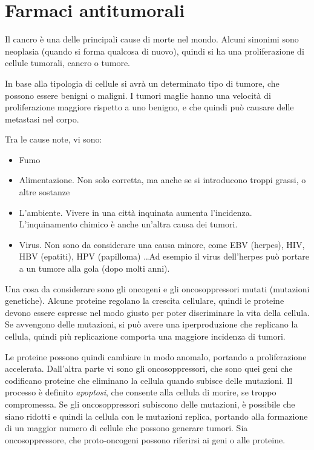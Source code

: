 \chapter{Farmaci antitumorali}

Il cancro è una delle principali cause di morte nel mondo. Alcuni
sinonimi sono neoplasia (quando si forma qualcosa di nuovo), quindi si
ha una proliferazione di cellule tumorali, cancro o tumore.

In base alla tipologia di cellule si avrà un determinato tipo di tumore,
che possono essere benigni o maligni. I tumori maglie hanno una velocità
di proliferazione maggiore rispetto a uno benigno, e che quindi può
causare delle metastasi nel corpo.

Tra le cause note, vi sono:
\begin{itemize}
\item
  Fumo
\item
  Alimentazione. Non solo corretta, ma anche se si introducono troppi
  grassi, o altre sostanze
\item
  L'ambiente. Vivere in una città inquinata aumenta l'incidenza.
  L'inquinamento chimico è anche un'altra causa dei tumori.
\item
  Virus. Non sono da considerare una causa minore, come EBV (herpes),
  HIV, HBV (epatiti), HPV (papilloma) \ldots Ad esempio il virus
  dell'herpes può portare a un tumore alla gola (dopo molti anni).
\end{itemize}

Una cosa da considerare sono gli oncogeni e gli oncosoppressori mutati
(mutazioni genetiche). Alcune proteine regolano la crescita cellulare,
quindi le proteine devono essere espresse nel modo giusto per poter
discriminare la vita della cellula. Se avvengono delle mutazioni, si
può avere una iperproduzione che replicano la cellula, quindi più
replicazione comporta una maggiore incidenza di tumori.

Le proteine
possono quindi cambiare in modo anomalo, portando a proliferazione
accelerata. Dall'altra parte vi sono gli oncosoppressori, che sono
quei geni che codificano proteine che eliminano la cellula quando
subisce delle mutazioni. Il processo è definito \emph{apoptosi}, che
consente alla cellula di morire, se troppo compromessa. Se gli
oncosoppressori subiscono delle mutazioni, è possibile che siano
ridotti e quindi la cellula con le mutazioni replica, portando alla
formazione di un maggior numero di cellule che possono generare
tumori. Sia oncosoppressore, che proto-oncogeni possono riferirsi ai
geni o alle proteine.

